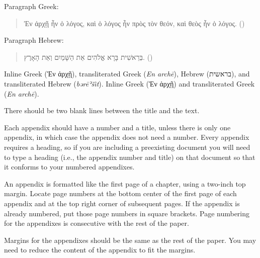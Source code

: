 \documentclass[letterpaper,12pt]{article}
\begin{document}
Paragraph Greek:
\begin{quote}
  Ἐν ἀρχῇ ἦν ὁ λόγος, καὶ ὁ λόγος ἦν πρὸς τὸν θεόν, καὶ θεὸς ἦν ὁ λόγος.
  \foreignlanguage{american}{()}
\end{quote}
\ifxetexorluatex
  Paragraph Hebrew:
  \begin{quote}
    \ifxetex
      \raggedleft
    \fi
    בְּרֵאשִׁית בָּרָא אֱלֹהִים אֵת הַשָּׁמַיִם וְאֵת הָאָרֶץ.
    \foreignlanguage{american}{()}
  \end{quote}
\fi
\ifxetexorluatex
  Inline Greek (\foreignlanguage{greek}{Ἐν ἀρχῇ}),
  transliterated Greek (\emph{En archē}),
  Hebrew (\foreignlanguage{hebrew}{בראשית}), and
  transliterated Hebrew (\emph{bərēʾšı̂t}).
\else
  Inline Greek (\foreignlanguage{greek}{Ἐν ἀρχῇ}) and
  transliterated Greek (\emph{En archē}).
\fi

\appendix


%
There should be two blank lines between the title and the text.

Each appendix should have a number and a title, unless there is only one
appendix, in which case the appendix does not need a number. Every appendix
requires a heading, so if you are including a preexisting document you will
need to type a heading (i.e., the appendix number and title) on that document
so that it conforms to your numbered appendixes.

An appendix is formatted like the first page of a chapter, using a two-inch
top margin. Locate page numbers at the bottom center of the first page of each
appendix and at the top right corner of subsequent pages. If the appendix is
already numbered, put those page numbers in square brackets. Page numbering
for the appendixes is consecutive with the rest of the paper.

Margins for the appendixes should be the same as the rest of the paper. You
may need to reduce the content of the appendix to fit the margins.

\printbibliography[heading=bibintoc]

\singlespacing

\printindex


\end{document}
